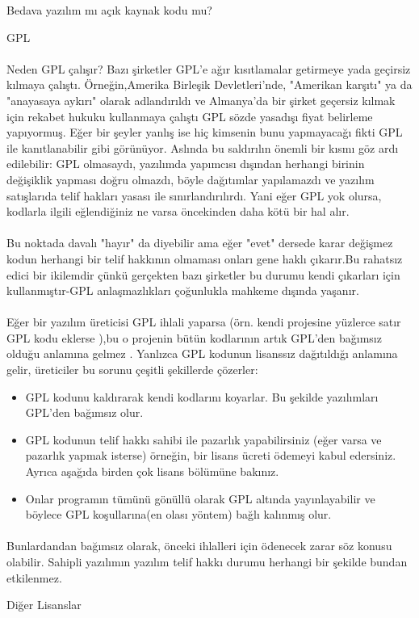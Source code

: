 \documentclass[10pt,a5paper]{book}
\begin{document}
\begin{section}{Bedava yazılım mı açık kaynak kodu mu?}
\begin{subsection}{GPL}
\paragraph{}{Neden GPL çalışır? Bazı şirketler GPL'e ağır kısıtlamalar getirmeye yada geçirsiz kılmaya çalıştı. Örneğin,Amerika Birleşik Devletleri'nde, "Amerikan karşıtı" ya da "anayasaya aykırı" olarak adlandırıldı ve Almanya'da bir şirket geçersiz kılmak için rekabet hukuku kullanmaya çalıştı GPL sözde yasadışı fiyat belirleme yapıyormuş. Eğer bir şeyler yanlış ise hiç kimsenin bunu yapmayacağı fikti GPL ile kanıtlanabilir gibi görünüyor. Aslında bu saldırılın önemli bir kısmı göz ardı edilebilir: GPL olmasaydı, yazılımda yapımcısı dışından herhangi birinin değişiklik yapması doğru olmazdı, böyle dağıtımlar yapılamazdı ve yazılım satışlarıda telif hakları yasası ile sınırlandırılırdı. Yani eğer GPL yok olursa, kodlarla ilgili eğlendiğiniz ne varsa öncekinden daha kötü bir hal alır.}
\paragraph{}{Bu noktada davalı "hayır" da diyebilir ama eğer "evet" dersede karar değişmez kodun herhangi bir telif hakkının olmaması onları gene haklı çıkarır.Bu rahatsız edici bir ikilemdir çünkü gerçekten bazı şirketler bu durumu kendi çıkarları için kullanmıştır-GPL anlaşmazlıkları çoğunlukla mahkeme dışında yaşanır.}
\paragraph{}{Eğer bir yazılım üreticisi GPL ihlali yaparsa (örn. kendi projesine yüzlerce satır GPL kodu eklerse ),bu o projenin bütün kodlarının artık GPL'den bağımsız olduğu anlamına gelmez . Yanlızca GPL kodunun lisanssız dağıtıldığı anlamına gelir, üreticiler  bu sorunu çeşitli şekillerde çözerler:}
\begin{itemize}
 \item GPL kodunu kaldırarak kendi kodlarını koyarlar. Bu şekilde yazılımları GPL'den bağımsız olur.
 \item GPL kodunun  telif hakkı sahibi ile pazarlık yapabilirsiniz (eğer varsa ve pazarlık yapmak isterse) örneğin, bir lisans ücreti ödemeyi kabul edersiniz.
Ayrıca aşağıda birden çok lisans bölümüne bakınız.
 \item Onlar programın tümünü gönüllü olarak GPL altında  yayınlayabilir ve böylece GPL koşullarına(en olası yöntem) bağlı kalınmış olur.
 \end{itemize}
\paragraph{}{Bunlardandan bağımsız olarak, önceki ihlalleri için ödenecek zarar söz konusu olabilir. Sahipli yazılımın yazılım telif hakkı durumu  herhangi bir şekilde bundan etkilenmez.}
\end{subsection}
\begin{subsection}{Diğer Lisanslar}

\end{subsection}
\end{section}
\end{document}

